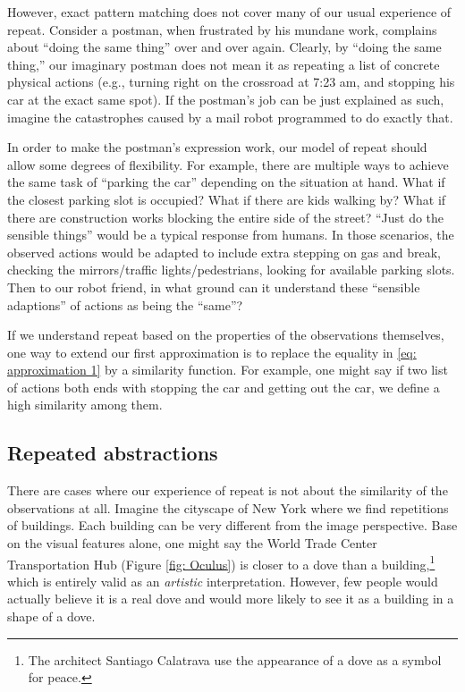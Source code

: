 However, exact pattern matching does not cover many of our usual experience of repeat. Consider a postman, when frustrated by his mundane work, complains about ``doing the same thing'' over and over again. Clearly, by ``doing the same thing,'' our imaginary postman does not mean it as repeating a list of concrete physical actions (e.g., turning right on the crossroad at 7:23 am, and stopping his car at the exact same spot). If the postman's job can be just explained as such, imagine the catastrophes caused by a mail robot programmed to do exactly that. 

In order to make the postman's expression work, our model of repeat should allow some degrees of flexibility. For example, there are multiple ways to achieve the same task of ``parking the car'' depending on the situation at hand. What if the closest parking slot is occupied? What if there are kids walking by? What if there are construction works blocking the entire side of the street? ``Just do the sensible things'' would be a typical response from humans. In those scenarios, the observed actions would be adapted to include extra stepping on gas and break, checking the mirrors/traffic lights/pedestrians, looking for available parking slots. Then to our robot friend, in what ground can it understand these ``sensible adaptions'' of actions as being the ``same''? 

If we understand repeat based on the properties of the observations themselves, one way to extend our first approximation is to replace the equality in \ref{eq: approximation 1} by a  similarity function. For example, one might say if two list of actions both ends with stopping the car and getting out the car, we define a high similarity among them. 




\subsection{Repeated abstractions}

There are cases where our experience of repeat is not about the similarity of the observations at all. Imagine the cityscape of New York where we find repetitions of buildings. Each building can be very different from the image perspective. Base on the visual features alone, one might say the World Trade Center Transportation Hub (Figure \ref{fig: Oculus}) is closer to a dove than a building,\footnote{The architect Santiago Calatrava use the appearance of a dove as a symbol for peace.} which is entirely valid as an \emph{artistic} interpretation. However, few people would actually believe it is a real dove and would more likely to see it as a building in a shape of a dove. 

